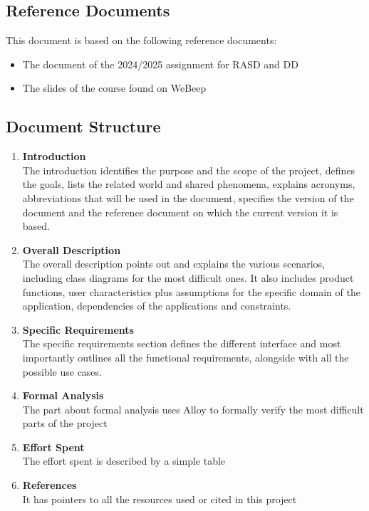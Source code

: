 
\subsection{Reference Documents}
This document is based on the following reference documents:
\begin{itemize}
\item {The document of the 2024/2025 assignment for RASD and DD }
\item {The slides of the course found on WeBeep}
\end{itemize}


\subsection{Document Structure}
\begin{enumerate}
\item\textbf{Introduction}\\
The introduction identifies the purpose and the scope of the project, defines the goals, lists the related world and shared phenomena, explains acronyms, abbreviations that will be used in the document, specifies the version of the document and the reference document on which the current version it is based.
\item\textbf{Overall Description}\\
The overall description points out and explains the various scenarios, including class diagrams for the most difficult ones. It also includes product functions, user characteristics plus assumptions for the specific domain of the application, dependencies of the applications and constraints.
\item\textbf{Specific Requirements}\\
The specific requirements section defines the different interface and most importantly outlines all the functional requirements, alongside with all the possible use cases.
\item\textbf{Formal Analysis} \\
The part about formal analysis uses Alloy to formally verify the most difficult parts of the project
\item\textbf{Effort Spent}\\
The effort spent is described by a simple table
\item\textbf{References}\\
It has pointers to all the resources used or cited in this project
\end{enumerate}



